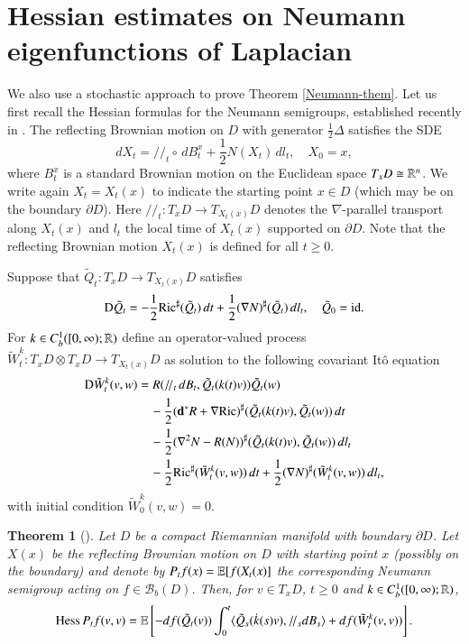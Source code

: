 \documentclass[11pt,reqno]{amsart}
\newtheorem{theorem}{Theorem}[section]
\theoremstyle{definition} \newtheorem{remark}[theorem]{Remark}
\numberwithin{equation}{section}
\def\Ric{{\operatorname{Ric}}} \def\Hess{\operatorname{Hess}}
\newcommand\1{\mathbbm{1}}
\def\Ric{{\operatorname{Ric}}} \def\Aut{{\operatorname{Aut}}}
\def\mathpal#1{\mathop{\mathchoice{\text{\rm #1}}%
    {\text{\rm #1}}{\text{\rm #1}}%
    {\text{\rm #1}}}\nolimits} \def\id{{\mathpal{id}}}
\def\bd{{\bf d}}
\def\r{\right}
\def\l{\left} \def\e{\operatorname{e}} \def\dsum{\displaystyle\sum}
\newcommand{\ptr}{/\!/}
\def\id{{\mathpal{id}}}
\def\mathpal#1{\mathop{\mathchoice{\text{\rm #1}}%
      {\text{\rm #1}}{\text{\rm #1}}%
      {\text{\rm #1}}}\nolimits}
\begin{document}
\section{Hessian estimates on Neumann eigenfunctions of Laplacian}\label{Neuman-Section}

We also use a stochastic approach to prove Theorem \ref{Neumann-them}. Let us first recall the
Hessian formulas for the Neumann semigroups, established recently in \cite{CT22}. 
The reflecting Brownian motion on $D$ with generator $\frac12\Delta$ satisfies the SDE
$$d X_t=\ptr_t\circ\,d B_t^x+\frac12N(X_t)\, d l_t,\quad X_0=x,$$
where $B_t^x$ is a standard Brownian motion on the Euclidean space $T_xD\cong \mathbb{R}^n$.
We write again $X_t=X_t(x)$ to indicate the starting point $x\in D$ (which may be on the boundary $\partial D$).
Here $\ptr_t: T_xD\rightarrow T_{X_t(x)}D$ denotes the $\nabla$-parallel
transport along $X_t(x)$ and
$l_t$ the local time of $X_t(x)$ supported on $\partial D$.
Note that the reflecting Brownian motion $X_t(x)$ is defined for all $t\geq0$. 

Suppose that $\tilde{Q}_t\colon T_xD\rightarrow T_{X_t(x)}D$ satisfies
\begin{align}\label{eq-tildeQ}
 \text{D}\tilde{Q}_t=-\frac12\Ric^{\sharp}(\tilde{Q}_t)\, d t+\frac12(\nabla N)^ {\sharp}(\tilde{Q}_t)\, d l_t, \quad \tilde{Q}_0=\id.
\end{align}
For $k\in C^1_b([0,\infty);\mathbb{R})$ define an operator-valued process
$\tilde{W}_t^k\colon T_xD\otimes T_xD\rightarrow T_{X_t(x)}D$ as solution to the following  covariant It\^{o} equation
\begin{align}\label{eq-tildeW}
\text{D}\tilde{W}_t^k(v, w)&=R(\ptr_t\, d B_t, \tilde{Q}_t(k(t)v))\tilde{Q}_t(w)\notag\\
&\quad-\frac12(\bd^*R+\nabla \Ric)^{\sharp}(\tilde{Q}_t(k(t)v), \tilde{Q}_t(w))\, d t\notag\\
&\quad-\frac12(\nabla^2N-R(N))^{\sharp}(\tilde{Q}_t(k(t)v), \tilde{Q}_t(w))\,d l_t\notag\\
&\quad-\frac12\Ric^{\sharp}(\tilde{W}_t^k(v, w))\,d t+\frac12(\nabla N)^{\sharp}(\tilde{W}_t^k(v, w))\,d l_t,
\end{align}
with initial condition $\tilde{W}_0^k(v,w)=0$.

\begin{theorem}[\cite{CT22}]\label{th5}
Let $D$ be a compact Riemannian manifold with
boundary $\partial D$. Let $X(x)$ be the reflecting Brownian motion on $D$ with
starting point $x$ (possibly on the boundary) and denote by $P_tf(x)=\mathbb{E}[f(X_t(x)]$
the corresponding Neumann semigroup acting on $f\in \mathcal{B}_b(D)$.
Then, for $v\in T_xD$, $t\geq 0$ and $k\in C^1_b([0,\infty); \mathbb{R})$,
 \begin{equation*}
    \Hess {P_tf}(v,v)=\E\l[-d f(\tilde{Q}_t(v))\int_0^t\langle \tilde{Q}_s(\dot{k}(s)v),
    \ptr_s d  B_s\rangle+ d f( \tilde{W}_t^k(v,v))\r].
  \end{equation*}
\end{theorem}
\end{document}
